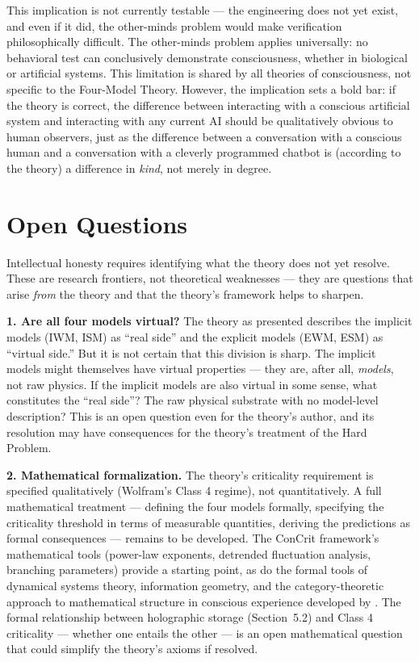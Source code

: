 \documentclass[12pt]{article}
\begin{document}
This implication is not currently testable --- the engineering does not yet exist, and even if it did, the other-minds problem would make verification philosophically difficult. The other-minds problem applies universally: no behavioral test can conclusively demonstrate consciousness, whether in biological or artificial systems. This limitation is shared by all theories of consciousness, not specific to the Four-Model Theory. However, the implication sets a bold bar: if the theory is correct, the difference between interacting with a conscious artificial system and interacting with any current AI should be qualitatively obvious to human observers, just as the difference between a conversation with a conscious human and a conversation with a cleverly programmed chatbot is (according to the theory) a difference in \emph{kind}, not merely in degree.



\section{Open Questions}


Intellectual honesty requires identifying what the theory does not yet resolve. These are research frontiers, not theoretical weaknesses --- they are questions that arise \emph{from} the theory and that the theory's framework helps to sharpen.

\textbf{1. Are all four models virtual?} The theory as presented describes the implicit models (IWM, ISM) as ``real side'' and the explicit models (EWM, ESM) as ``virtual side.'' But it is not certain that this division is sharp. The implicit models might themselves have virtual properties --- they are, after all, \emph{models}, not raw physics. If the implicit models are also virtual in some sense, what constitutes the ``real side''? The raw physical substrate with no model-level description? This is an open question even for the theory's author, and its resolution may have consequences for the theory's treatment of the Hard Problem.

\textbf{2. Mathematical formalization.} The theory's criticality requirement is specified qualitatively (Wolfram's Class 4 regime), not quantitatively. A full mathematical treatment --- defining the four models formally, specifying the criticality threshold in terms of measurable quantities, deriving the predictions as formal consequences --- remains to be developed. The ConCrit framework's mathematical tools (power-law exponents, detrended fluctuation analysis, branching parameters) provide a starting point, as do the formal tools of dynamical systems theory, information geometry, and the category-theoretic approach to mathematical structure in conscious experience developed by \citet{Kleiner2024}. The formal relationship between holographic storage (Section~5.2) and Class 4 criticality --- whether one entails the other --- is an open mathematical question that could simplify the theory's axioms if resolved.
\end{document}
